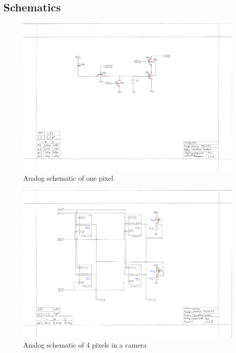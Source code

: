\documentclass[a4paper, 12pt, english]{article}
\begin{document}
\newpage
\begin{appendices}
  

  \section{Schematics} \label{ap:Schematics}
  \begin{figure}[H]
    \centering
    \includegraphics[angle=-90, scale=0.45]{figures/SchematicPixel.pdf}
    \caption{Analog schematic of one pixel}
    \label{fig:analogPixel}
  \end{figure}
  \begin{figure}[H]
    \centering
    \includegraphics[angle=-90, scale=0.51]{figures/SchematicCamera.pdf}
    \caption{Analog schematic of 4 pixels in a camera}
    \label{fig:analogCamera}
  \end{figure}


\end{appendices}
\end{document}
